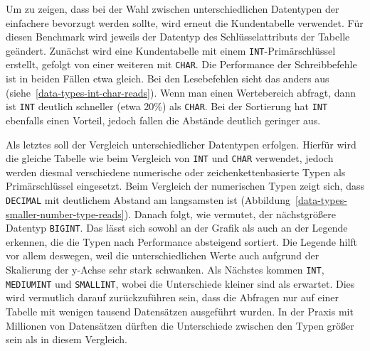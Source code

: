 Um zu zeigen, dass bei der Wahl zwischen unterschiedlichen Datentypen der einfachere bevorzugt werden sollte, wird erneut die Kundentabelle verwendet.
Für diesen Benchmark wird jeweils der Datentyp des Schlüsselattributs der Tabelle geändert.
Zunächst wird eine Kundentabelle mit einem \texttt{INT}-Primärschlüssel erstellt, gefolgt von einer weiteren mit \texttt{CHAR}.
Die Performance der Schreibbefehle ist in beiden Fällen etwa gleich.
Bei den Lesebefehlen sieht das anders aus (siehe~\ref{data-types-int-char-reads}).
Wenn man einen Wertebereich abfragt, dann ist \texttt{INT} deutlich schneller (etwa 20\%) als \texttt{CHAR}.
Bei der Sortierung hat \texttt{INT} ebenfalls einen Vorteil, jedoch fallen die Abstände deutlich geringer aus.

Als letztes soll der Vergleich unterschiedlicher Datentypen erfolgen.
Hierfür wird die gleiche Tabelle wie beim Vergleich von \texttt{INT} und \texttt{CHAR} verwendet, jedoch werden diesmal verschiedene numerische oder zeichenkettenbasierte Typen als Primärschlüssel eingesetzt.
Beim Vergleich der numerischen Typen zeigt sich, dass \texttt{DECIMAL} mit deutlichem Abstand am langsamsten ist (Abbildung~\ref{data-types-smaller-number-type-reads}).
Danach folgt, wie vermutet, der nächstgrößere Datentyp \texttt{BIGINT}.
Das lässt sich sowohl an der Grafik als auch an der Legende erkennen, die die Typen nach Performance absteigend sortiert.
Die Legende hilft vor allem deswegen, weil die unterschiedlichen Werte auch aufgrund der Skalierung der y-Achse sehr stark schwanken.
Als Nächstes kommen \texttt{INT}, \texttt{MEDIUMINT} und \texttt{SMALLINT}, wobei die Unterschiede kleiner sind als erwartet.
Dies wird vermutlich darauf zurückzuführen sein, dass die Abfragen nur auf einer Tabelle mit wenigen tausend Datensätzen ausgeführt wurden.
In der Praxis mit Millionen von Datensätzen dürften die Unterschiede zwischen den Typen größer sein als in diesem Vergleich.


